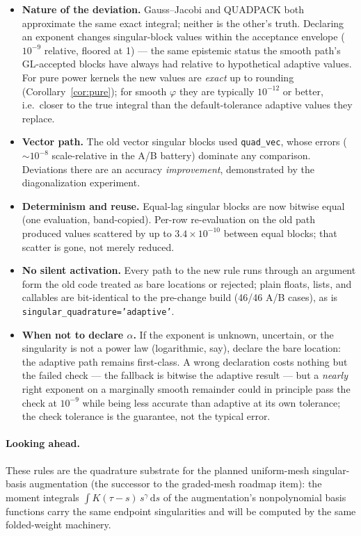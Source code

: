 \documentclass[11pt]{article}
\newcommand{\dd}{\,\mathrm{d}}
\newcommand{\kw}[1]{\texttt{#1}}
\begin{document}
\begin{itemize}
  \item \textbf{Nature of the deviation.} Gauss--Jacobi and QUADPACK both
  approximate the same exact integral; neither is the other's truth.
  Declaring an exponent changes singular-block values within the
  acceptance envelope ($10^{-9}$ relative, floored at 1) --- the same
  epistemic status the smooth path's GL-accepted blocks have always had
  relative to hypothetical adaptive values. For pure power kernels the
  new values are \emph{exact} up to rounding
  (Corollary~\ref{cor:pure}); for smooth $\varphi$ they are typically
  $10^{-12}$ or better, i.e.\ closer to the true integral than the
  default-tolerance adaptive values they replace.
  \item \textbf{Vector path.} The old vector singular blocks used
  \kw{quad\_vec}, whose errors ($\sim10^{-8}$ scale-relative in the A/B
  battery) dominate any comparison. Deviations there are an accuracy
  \emph{improvement}, demonstrated by the diagonalization experiment.
  \item \textbf{Determinism and reuse.} Equal-lag singular blocks are now
  bitwise equal (one evaluation, band-copied). Per-row re-evaluation on
  the old path produced values scattered by up to $3.4\times10^{-10}$
  between equal blocks; that scatter is gone, not merely reduced.
  \item \textbf{No silent activation.} Every path to the new rule runs
  through an argument form the old code treated as bare locations or
  rejected; plain floats, lists, and callables are bit-identical to the
  pre-change build (46/46 A/B cases), as is
  \kw{singular\_quadrature='adaptive'}.
  \item \textbf{When not to declare $\alpha$.} If the exponent is unknown,
  uncertain, or the singularity is not a power law (logarithmic, say),
  declare the bare location: the adaptive path remains first-class. A
  wrong declaration costs nothing but the failed check --- the fallback
  is bitwise the adaptive result --- but a \emph{nearly} right exponent
  on a marginally smooth remainder could in principle pass the check at
  $10^{-9}$ while being less accurate than adaptive at its own
  tolerance; the check tolerance is the guarantee, not the typical error.
\end{itemize}

\paragraph{Looking ahead.} These rules are the quadrature substrate for
the planned uniform-mesh singular-basis augmentation (the successor to
the graded-mesh roadmap item): the moment integrals
$\int K(\tau-s)\,s^{\gamma}\dd s$ of the augmentation's nonpolynomial
basis functions carry the same endpoint singularities and will be
computed by the same folded-weight machinery.
\end{document}
